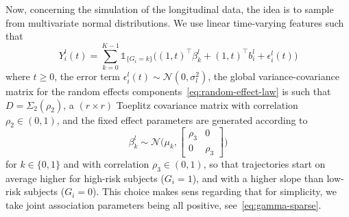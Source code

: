 \documentclass[11pt]{article}
\newcommand{\ind}[1]{\mathds{1}_{#1}}
\newcommand{\cN}{\mathcal N}
\newcommand{\bSigma}{\textbf{$\Sigma$}}
\begin{document}
Now, concerning the simulation of the longitudinal data, the idea is to sample from multivariate normal distributions. 
We use linear time-varying features such that
\[ Y_i^l(t) = \sum_{k=0}^{K-1} \ind{\{G_i=k\}} \big( (1, t)^\top \beta_k^l + (1, t)^\top b_i^l + \epsilon_i^l(t) \big) \]
where $t \geq 0$, the error term $\epsilon_i^l(t) \sim \cN(0, \sigma_l^2)$, the global variance-covariance matrix for the random effects components~\eqref{eq:random-effect-law} is such that $D = \bSigma_2(\rho_2)$, a $(r \times r)$ Toeplitz covariance matrix with correlation $\rho_2 \in (0, 1)$, and the fixed effect parameters are generated according to 
\[ \beta_k^l \sim \cN\Big( 
\mu_k, 
\begin{bmatrix}
  \rho_3 & 0\\
  0 & \rho_3
\end{bmatrix} 
\Big) \]
for $k \in \{0, 1\}$ and with correlation $\rho_3 \in (0, 1)$, so that trajectories start on average higher for high-risk subjects ($G_i=1$), and with a higher slope than low-risk subjects ($G_i=0$). This choice makes sens regarding that for simplicity, we take joint association parameters being all positive, see~\eqref{eq:gamma-sparse}.
\end{document}
